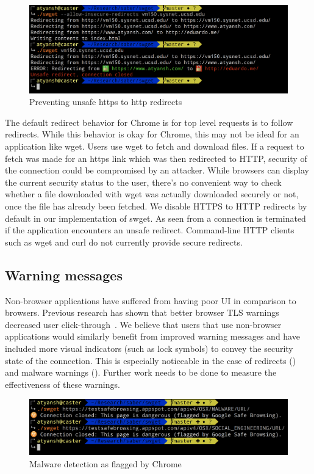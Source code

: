 \begin{figure}[H]
  \includegraphics[width=\textwidth]{figures/redirect}
  \caption{Preventing unsafe https to http redirects} 
  \label{fig:redirect-saber}
\end{figure}

The default redirect behavior for Chrome is for top level requests is to follow
redirects. While this behavior is okay for Chrome, this may not be ideal for an
application like wget. Users use wget to fetch and download files. If a request
to fetch was made for an https link which was then redirected to HTTP, security
of the connection could be compromised by an attacker. While browsers can
display the current security status to the user, there's no convenient way to
check whether a file downloaded with wget was actually downloaded securely or
not, once the file has already been fetched. We disable HTTPS to HTTP redirects
by default in our implementation of swget. As seen from
 a connection is terminated if the application
encounters an unsafe redirect. Command-line HTTP clients such as wget and curl
do not currently provide secure redirects.

\subsection{Warning messages}
Non-browser applications have suffered from having poor UI in comparison to
browsers. Previous research has shown that better browser TLS warnings
decreased user click-through~\cite{warningland}. We believe that users that use
non-browser applications would similarly benefit from improved warning messages
and have included more visual indicators (such as lock symbols) to convey the
security state of the connection. This is especially noticeable in the case of
redirects () and malware warnings
(). Further work needs to be done to measure the
effectiveness of these warnings.

\begin{figure}[h]
  \includegraphics[width=\textwidth]{figures/malware}
  \caption{Malware detection as flagged by Chrome} 
  \label{fig:malware-saber}
\end{figure}

